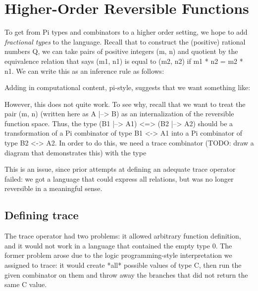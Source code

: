 \documentclass{llncs}
\begin{document}
\section{Higher-Order Reversible Functions}

To get from {{Pi}} types and combinators to a higher order setting, we hope to
add \emph{fractional types} to the language. Recall that to construct the
(positive) rational numbers {{Q}}, we can take pairs of positive integers
{{(m, n)}} and quotient by the equivalence relation that says {{(m1, n1)}} is
equal to {{(m2, n2)}} if {{m1 * n2 = m2 * n1}}. We can write this as an
inference rule as follows:


\noindent
Adding in computational content, pi-style, suggests that we want something like:


\noindent
However, this does not quite work. To see why, recall that we want to treat the
pair {{(m, n)}} (written here as {{A |--> B}}) as an internalization of the
reversible function space. Thus, the type {{(B1 |--> A1) <=> (B2 |--> A2)}}
should be a transformation of a {{Pi}} combinator of type {{B1 <-> A1}} into a
{{Pi}} combinator of type {{B2 <-> A2}}. In order to do this, we need a trace
combinator (TODO: draw a diagram that demonstrates this) with the type


\noindent
This is an issue, since prior attempts at defining an adequate trace operator
failed: we got a language that could express all relations, but was no longer
reversible in a meaningful sense.

\subsection{Defining trace}

The trace operator had two problems: it allowed arbitrary function definition,
and it would not work in a language that contained the empty type {{0}}. The
former problem arose due to the logic programming-style interpretation we
assigned to trace: it would create *all* possible values of type {{C}}, then run
the given combinator on them and throw away the branches that did not return the
same {{C}} value.
\end{document}
